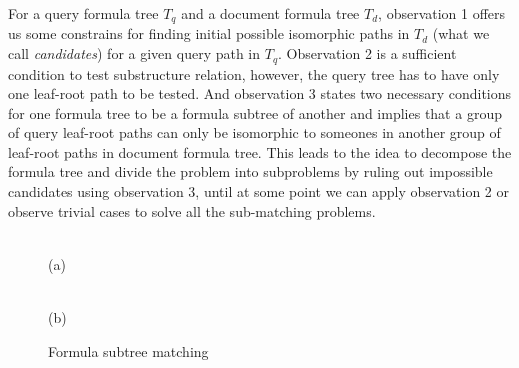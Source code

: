 \documentclass{acm_proc_article-sp}
\begin{document}
For a query formula tree $T_q$ and a document formula tree $T_d$, observation 1 offers us some constrains for finding initial possible isomorphic paths in $T_d$ (what we call \textit{candidates}) for a given query path in $T_q$.
Observation 2 is a sufficient condition to test substructure relation, however, the query tree has to have only one leaf-root path to be tested. 
And observation 3 states two necessary conditions for one formula tree to be a formula subtree of another and implies that a group of query leaf-root paths can only be isomorphic to someones in another group of leaf-root paths in document formula tree. 
This leads to the idea to decompose the formula tree and divide the problem into subproblems by ruling out impossible candidates using observation 3, until at some point we can apply observation 2 or observe trivial cases to solve all the sub-matching problems.

\begin{figure}
\begin{minipage}[b]{1.65in}
\begin{center}
\\(a)
\end{center}
\end{minipage}
\hspace*{0in}
\begin{minipage}[b]{1.65in}
\begin{center}
\\(b)
\end{center}
\end{minipage}
\caption{Formula subtree matching}\label{submatch}
\end{figure}
\end{document}
